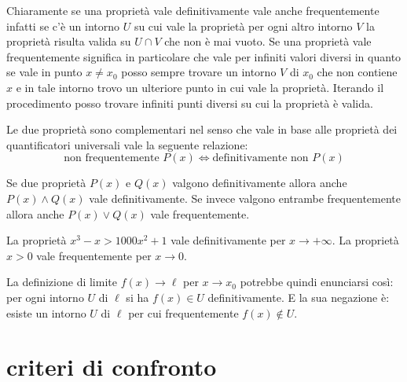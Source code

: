 Chiaramente se una proprietà vale definitivamente vale anche frequentemente
infatti se c'è un intorno $U$ su cui vale la proprietà per ogni altro intorno 
$V$ la proprietà risulta valida su $U\cap V$ che non è mai vuoto.
Se una proprietà vale frequentemente significa in particolare che vale per 
infiniti valori diversi in quanto se vale in punto $x\neq x_0$ 
posso sempre trovare un intorno $V$ di $x_0$ che non contiene $x$
e in tale intorno trovo un ulteriore punto in cui vale la proprietà. 
Iterando il procedimento posso trovare infiniti punti diversi su cui 
la proprietà è valida.

Le due proprietà sono complementari nel senso che vale 
in base alle proprietà dei quantificatori universali vale 
la seguente relazione:
\[
  \text{non frequentemente $P(x)$} \iff
  \text{definitivamente non $P(x)$}
\]

Se due proprietà $P(x)$ e $Q(x)$ valgono definitivamente allora anche
$P(x)\land Q(x)$ vale definitivamente. Se invece valgono entrambe
frequentemente allora anche $P(x) \lor Q(x)$ vale frequentemente.

\begin{example}
La proprietà $x^3 - x > 1000 x^2 + 1$
vale definitivamente per $x\to +\infty$.
La proprietà $x>0$ vale frequentemente per $x\to 0$.
\end{example}


La definizione di limite $f(x) \to \ell$ per $x\to x_0$ 
potrebbe quindi enunciarsi così:
per ogni intorno $U$ di $\ell$ si ha $f(x)\in U$ definitivamente.
E la sua negazione è: esiste un intorno $U$ di $\ell$ per cui
frequentemente $f(x)\not\in U$.


\section{criteri di confronto}

